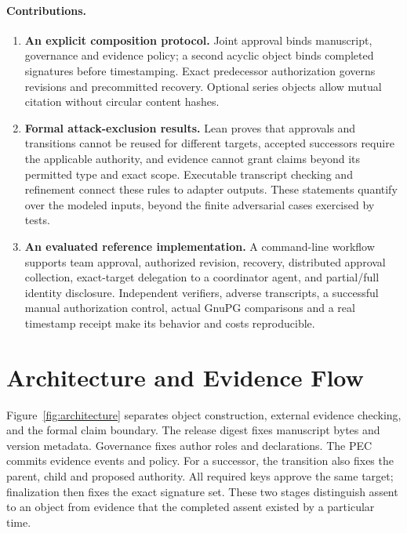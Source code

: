 \documentclass[acmsmall,screen,review,nonacm]{acmart}
\begin{document}
\paragraph{Contributions.}
\begin{enumerate}
  \item \textbf{An explicit composition protocol.}
  Joint approval binds manuscript, governance and evidence policy; a second
  acyclic object binds completed signatures before timestamping. Exact
  predecessor authorization governs revisions and precommitted recovery.
  Optional series objects allow mutual citation without circular content hashes.
  \item \textbf{Formal attack-exclusion results.}
  Lean proves that approvals and transitions cannot be reused for different
  targets, accepted successors require the applicable authority, and evidence
  cannot grant claims beyond its permitted type and exact scope. Executable
  transcript checking and refinement connect these rules to adapter outputs.
  These statements quantify over the modeled inputs, beyond the finite
  adversarial cases exercised by tests.
  \item \textbf{An evaluated reference implementation.}
  A command-line workflow supports team approval, authorized revision, recovery,
  distributed approval collection, exact-target delegation to a coordinator
  agent, and partial/full identity disclosure. Independent verifiers, adverse
  transcripts, a successful manual authorization control, actual GnuPG
  comparisons and a real timestamp receipt make its behavior and costs
  reproducible.
\end{enumerate}

\section{Architecture and Evidence Flow}
\label{sec:architecture}

Figure~\ref{fig:architecture} separates object construction, external evidence
checking, and the formal claim boundary. The release digest fixes manuscript
bytes and version metadata. Governance fixes author roles and declarations.
The PEC commits evidence events and policy. For a successor, the transition
also fixes the parent, child and proposed authority. All required keys approve
the same target; finalization then fixes the exact signature set.
These two stages distinguish assent to an object from evidence that the
completed assent existed by a particular time.
\end{document}
